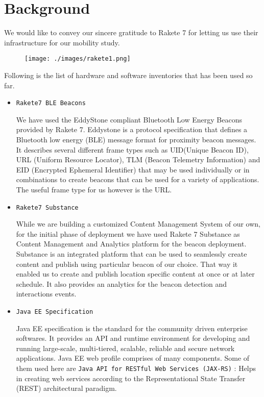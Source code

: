 \section{Background}
We would like to convey our sincere gratitude to Rakete 7 for letting us use their infrastructure for our mobility study.
\begin{figure}[H]
	\centering
	\texttt{[image: ./images/rakete1.png]} 
\end{figure} 
Following is the list of hardware and software inventories that has been used so far.

\begin{itemize}
	\item \texttt{Rakete7 BLE Beacons\cite{Rakete7}}
	\par We have used the EddyStone compliant Bluetooth Low Energy Beacons provided by Rakete 7. Eddystone is a protocol specification that defines a Bluetooth low energy (BLE) message format for proximity beacon messages. It describes several different frame types such as UID(Unique Beacon ID), URL (Uniform Resource Locator), TLM (Beacon Telemetry Information) and EID (Encrypted Ephemeral Identifier) that may be used individually or in combinations to create beacons that can be used for a variety of applications. The useful frame type for us however is the URL.
	
	\item \texttt{Rakete7 Substance\cite{Rakete7Substance}}
	\par While we are building a customized Content Management System of our own, for the initial phase of deployment we have used Rakete 7 Substance as Content Management and Analytics platform for the beacon deployment. Substance is an integrated platform that can be used to seamlessly create content and publish using particular beacon of our choice. That way it enabled us to create and publish location specific content at once or at later schedule. It also provides an analytics for the beacon detection and interactions events.
	
	\item \texttt{Java EE Specification\cite{JavaEE}}
	\par Java EE specification is the standard for the community driven enterprise softwares. It provides an API and runtime environment for developing and running large-scale, multi-tiered, scalable, reliable and secure network applications. Java EE web profile comprises of many components. Some of them used here are
		\subitem{-} \texttt{Java API for RESTful Web Services (JAX-RS)}  : Helps in creating web services according to the Representational State Transfer (REST)  architectural paradigm.
		

\end{itemize}
